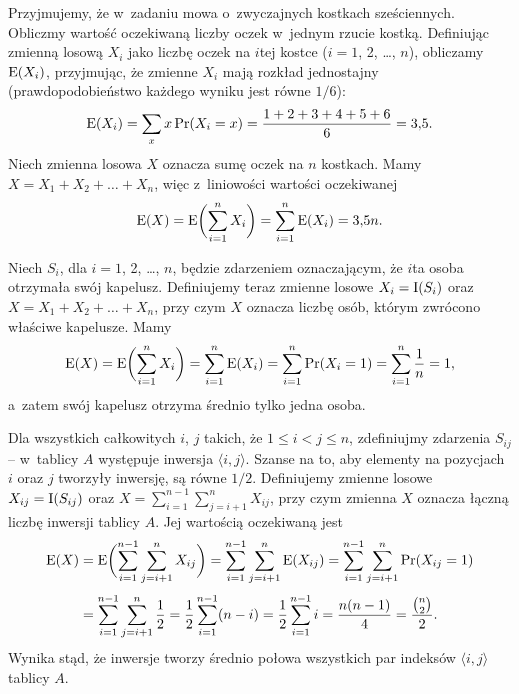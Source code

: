 \exercise %
Przyjmujemy, że w~zadaniu mowa o~zwyczajnych kostkach sześciennych.
Obliczmy wartość oczekiwaną liczby oczek w~jednym rzucie kostką.
Definiując zmienną losową $X_i$ jako liczbę oczek na $i$\nbhyphen tej kostce ($i=1$, 2, \dots, $n$), obliczamy $\operatorname{E}(X_i)$, przyjmując, że zmienne $X_i$ mają rozkład jednostajny (prawdopodobieństwo każdego wyniku jest równe $1/6$):
\[
	\operatorname{E}(X_i) = \sum_xx\Pr(X_i=x) = \frac{1+2+3+4+5+6}{6} = 3{,}5.
\]
Niech zmienna losowa $X$ oznacza sumę oczek na $n$ kostkach.
Mamy $X=X_1+X_2+\dots+X_n$, więc z~liniowości wartości oczekiwanej
\[
	\operatorname{E}(X) = \operatorname{E}\biggl(\sum_{i=1}^nX_i\biggr) = \sum_{i=1}^n\operatorname{E}(X_i) = 3{,}5n.
\]

\exercise %
Niech $S_i$, dla $i=1$, 2, \dots, $n$, będzie zdarzeniem oznaczającym, że $i$\nbhyphen ta osoba otrzymała swój kapelusz.
Definiujemy teraz zmienne losowe $X_i=\operatorname{I}(S_i)$ oraz $X=X_1+X_2+\dots+X_n$, przy czym $X$ oznacza liczbę osób, którym zwrócono właściwe kapelusze.
Mamy
\[
	\operatorname{E}(X) = \operatorname{E}\biggl(\sum_{i=1}^nX_i\biggr) = \sum_{i=1}^n\operatorname{E}(X_i) = \sum_{i=1}^n\Pr(X_i=1) = \sum_{i=1}^n\frac{1}{n} = 1,
\]
a~zatem swój kapelusz otrzyma średnio tylko jedna osoba.

\exercise %
Dla wszystkich całkowitych $i$, $j$ takich, że $1\le i<j\le n$, zdefiniujmy zdarzenia $S_{ij}$ -- w~tablicy $A$ występuje inwersja $\langle i,j\rangle$.
Szanse na to, aby elementy na pozycjach $i$ oraz $j$ tworzyły inwersję, są równe $1/2$.
Definiujemy zmienne losowe $X_{ij}=\operatorname{I}(S_{ij})$ oraz $X=\sum_{i=1}^{n-1}\sum_{j=i+1}^nX_{ij}$, przy czym zmienna $X$ oznacza łączną liczbę inwersji tablicy $A$.
Jej wartością oczekiwaną jest
\begin{align*}
	\operatorname{E}(X) &= \operatorname{E}\biggl(\sum_{i=1}^{n-1}\sum_{j=i+1}^nX_{ij}\biggr) = \sum_{i=1}^{n-1}\sum_{j=i+1}^n\operatorname{E}(X_{ij}) = \sum_{i=1}^{n-1}\sum_{j=i+1}^n\Pr(X_{ij}=1) \\[1mm]
	&= \sum_{i=1}^{n-1}\sum_{j=i+1}^n\frac{1}{2} = \frac{1}{2}\sum_{i=1}^{n-1}(n-i) = \frac{1}{2}\sum_{i=1}^{n-1}i = \frac{n(n-1)}{4} = \frac{\binom{n}{2}}{2}.
\end{align*}
Wynika stąd, że inwersje tworzy średnio połowa wszystkich par indeksów $\langle i,j\rangle$ tablicy $A$.
